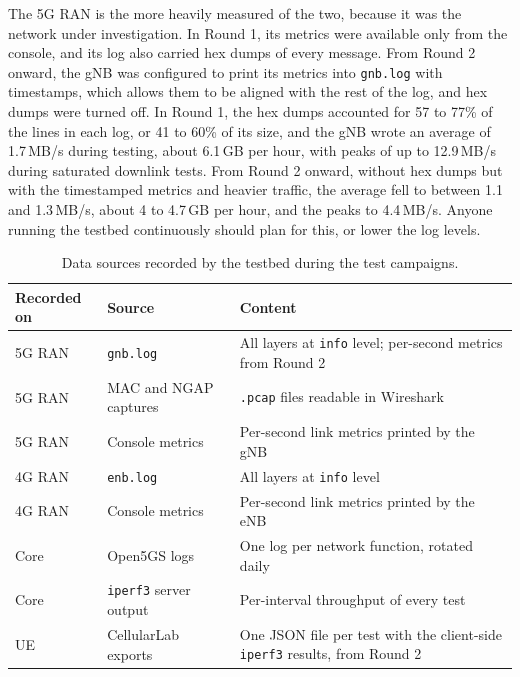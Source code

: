 The 5G \gls{RAN} is the more heavily measured of the two, because it was the network under investigation. In Round 1, its metrics were available only from the console, and its log also carried hex dumps of every message. From Round 2 onward, the \gls{gNB} was configured to print its metrics into \texttt{gnb.log} with timestamps, which allows them to be aligned with the rest of the log, and hex dumps were turned off.
In Round 1, the hex dumps accounted for 57 to 77\% of the lines in each log, or 41 to 60\% of its size, and the \gls{gNB} wrote an average of 1.7\,MB/s during testing, about 6.1\,GB per hour, with peaks of up to 12.9\,MB/s during saturated downlink tests. From Round 2 onward, without hex dumps but with the timestamped metrics and heavier traffic, the average fell to between 1.1 and 1.3\,MB/s, about 4 to 4.7\,GB per hour, and the peaks to 4.4\,MB/s. Anyone running the testbed continuously should plan for this, or lower the log levels.

\begin{table}[htbp]
    \centering
    \begin{tabular}{|l|l|p{6.2cm}|}
        \hline
        \textbf{Recorded on} & \textbf{Source} & \textbf{Content} \\
        \hline
        5G \gls{RAN} & \texttt{gnb.log} & All layers at \texttt{info} level; per-second metrics from Round 2 \\
        \hline
        5G \gls{RAN} & \gls{MAC} and \gls{NGAP} captures & \texttt{.pcap} files readable in Wireshark \\
        \hline
        5G \gls{RAN} & Console metrics & Per-second link metrics printed by the \gls{gNB} \\
        \hline
        4G \gls{RAN} & \texttt{enb.log} & All layers at \texttt{info} level \\
        \hline
        4G \gls{RAN} & Console metrics & Per-second link metrics printed by the \gls{eNB} \\
        \hline
        Core & Open5GS logs & One log per network function, rotated daily \\
        \hline
        Core & \texttt{iperf3} server output & Per-interval throughput of every test \\
        \hline
        \gls{UE} & CellularLab exports & One JSON file per test with the client-side \texttt{iperf3} results, from Round 2 \\
        \hline
    \end{tabular}
    \caption{Data sources recorded by the testbed during the test campaigns.}
    \label{tab:data-sources}
\end{table}

